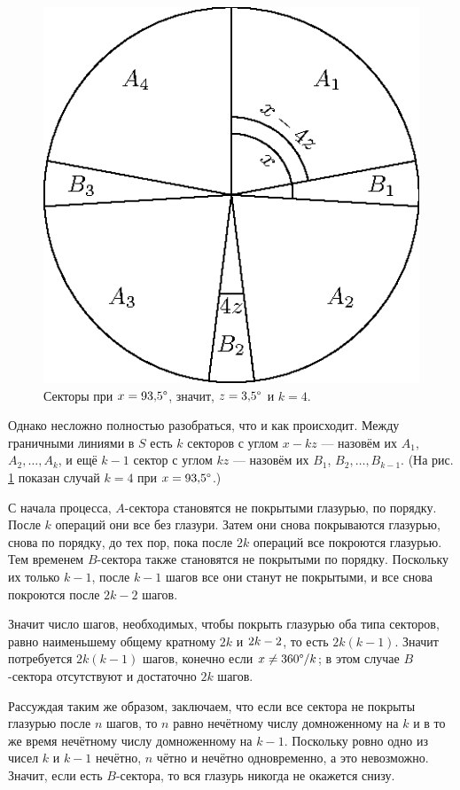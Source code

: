 \begin{figure}[hbt!]
\vskip-0mm
\centering
\includegraphics{mppics/pic-10}
\vskip-0mm
\caption{Секторы при $x = 93{,}5\degree$, значит, $z = 3{,}5\degree$ и $k=4$.}
\label{pic:tort3}
\end{figure}

Однако несложно полностью разобраться, что и как происходит.
Между граничными линиями в $S$ есть $k$ секторов с углом $x - kz$ --- назовём их $A_1$, $A_2, \dots , A_k$, и ещё $k - 1$ сектор с углом $kz$ --- назовём их $B_1$, $B_2, \dots , B_{k-1}$.
(На рис. \ref{pic:tort3} показан случай $k = 4$ при $x = 93{,}5\degree$.)

С начала процесса, $A$-сектора становятся не покрытыми глазурью, по порядку.
После $k$ операций они все без глазури.
Затем они снова покрываются глазурью, снова по порядку, до тех пор, пока после $2k$ операций все покроются глазурью.
Тем временем $B$-сектора также становятся не покрытыми по порядку.
Поскольку их только $k - 1$, после $k - 1$ шагов все они станут не покрытыми, и все снова покроются после $2k - 2$ шагов.

Значит число шагов, необходимых, чтобы покрыть глазурью оба типа секторов, равно наименьшему общему кратному $2k$ и $2k \z- 2$, то есть $2k(k - 1)$.
Значит потребуется $2k(k - 1)$ шагов, конечно если $x \z\ne 360\degree/k$;
в этом случае $B$-сектора отсутствуют и достаточно $2k$ шагов.

Рассуждая таким же образом, заключаем, что если все сектора не покрыты глазурью после $n$ шагов,
то $n$ равно нечётному числу домноженному на $k$
и в то же время нечётному числу домноженному на $k - 1$.
Поскольку ровно одно из чисел $k$ и $k - 1$ нечётно, $n$ чётно и нечётно одновременно,
а это невозможно.
Значит, если есть $B$-сектора, то вся глазурь никогда не окажется снизу.

